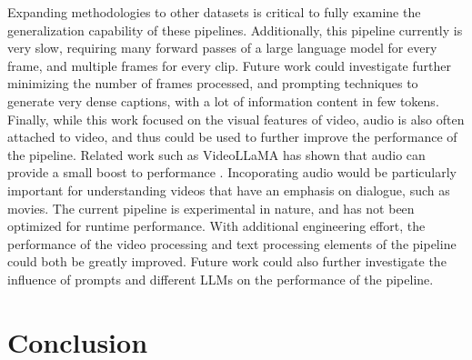 \documentclass{article}
\begin{document}
Expanding methodologies to other datasets is critical to fully examine the generalization capability of these pipelines.
Additionally, this pipeline currently is very slow, requiring many forward passes of a large language model for every frame, and multiple frames for every clip.
Future work could investigate further minimizing the number of frames processed, and prompting techniques to generate very dense captions, with a lot of information content in few tokens.
Finally, while this work focused on the visual features of video, audio is also often attached to video, and thus could be used to further improve the performance of the pipeline.
Related work such as VideoLLaMA has shown that audio can provide a small boost to performance \cite{videollama}.
Incoporating audio would be particularly important for understanding videos that have an emphasis on dialogue, such as movies.
The current pipeline is experimental in nature, and has not been optimized for runtime performance.
With additional engineering effort, the performance of the video processing and text processing elements of the pipeline could both be greatly improved.
Future work could also further investigate the influence of prompts and different LLMs on the performance of the pipeline.

\section{Conclusion}



\end{document}
